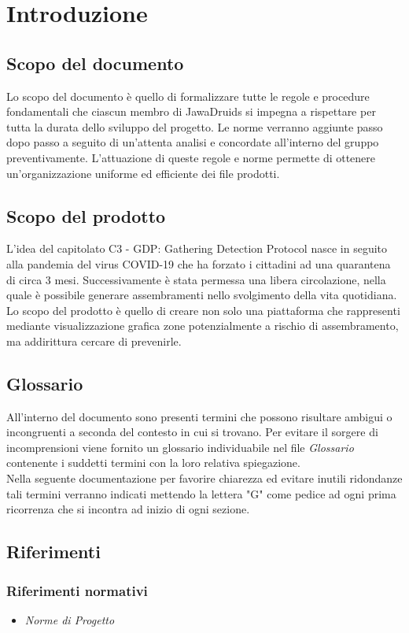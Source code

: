 \chapter{Introduzione}

\section{Scopo del documento}
Lo scopo del documento è quello di formalizzare tutte le regole e procedure fondamentali che ciascun membro di JawaDruids si impegna a rispettare per tutta la durata dello sviluppo del progetto. 
Le norme verranno aggiunte passo dopo passo a seguito di un'attenta analisi e concordate all'interno del gruppo preventivamente. L'attuazione di queste regole e norme permette di ottenere un'organizzazione uniforme ed efficiente dei file prodotti.
\section{Scopo del prodotto}
L'idea del capitolato C3 - GDP: Gathering Detection Protocol nasce in seguito alla pandemia del virus COVID-19 che ha forzato i cittadini ad una quarantena di circa 3 mesi. Successivamente è stata permessa una libera circolazione, nella quale è possibile generare assembramenti nello svolgimento della vita quotidiana. Lo scopo del prodotto è quello di creare non solo una piattaforma che rappresenti mediante visualizzazione grafica zone potenzialmente a rischio di assembramento, ma addirittura cercare di prevenirle.  
\section{Glossario}
All'interno del documento sono presenti termini che possono risultare ambigui o incongruenti a seconda del contesto in cui si trovano. Per evitare il sorgere di incomprensioni viene fornito un glossario individuabile nel file \textit{Glossario} contenente i suddetti termini con la loro relativa spiegazione.
\\Nella seguente documentazione per favorire chiarezza ed evitare inutili ridondanze tali termini verranno indicati mettendo la lettera "G" come pedice ad ogni prima ricorrenza che si incontra ad inizio di ogni sezione.

\section{Riferimenti}
\subsection{Riferimenti normativi}
\begin{itemize}
	\item \textit{Norme di Progetto}
\end{itemize}

